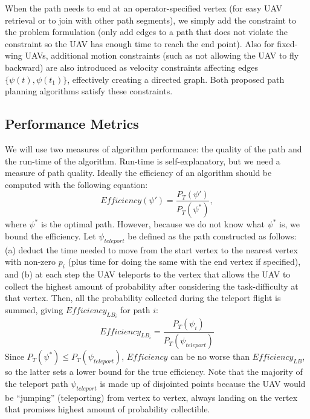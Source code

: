 When the path needs to end at an operator-specified vertex (for easy UAV retrieval or to join with other path segments), we simply add the constraint to the problem formulation (only add edges to a path that does not violate the constraint so the UAV has enough time to reach the end point). Also for fixed-wing UAVs, additional motion constraints (such as not allowing the UAV to fly backward) are also introduced as velocity constraints affecting edges $\{\psi(t), \psi(t_1)\}$, effectively creating a directed graph. Both proposed path planning algorithms satisfy these constraints.

\subsection{Performance Metrics}

We will use two measures of algorithm performance: the quality of the path and the run-time of the algorithm. Run-time is self-explanatory, but we need a measure of path quality. Ideally the efficiency of an algorithm should be computed with the following equation:
\begin{equation}
\mathit{Efficiency}(\psi') = \frac{P_T(\psi')}{P_T(\psi^*)},
\label{Efficiency}
\end{equation}
where $\psi^*$ is the optimal path. However, because we do not know what $\psi^*$ is, we bound the efficiency. Let $\psi_{teleport}$ be defined as the path constructed as follows: (a) deduct the time needed to move from the start vertex to the nearest vertex with non-zero $p_i$ (plus time for doing the same with the end vertex if specified), and (b) at each step the UAV teleports to the vertex that allows the UAV to collect the highest amount of probability after considering the task-difficulty at that vertex. Then, all the probability collected during the teleport flight is summed, giving $\mathit{Efficiency_{LB_i}}$ for path $i$:
\begin{equation}
\mathit{Efficiency_{LB_i}} = \frac{P_T(\psi_i)}{P_T(\psi_{teleport})}
\label{EfficiencyLB}
\end{equation}
Since $P_T(\psi^*) \leq P_T(\psi_{teleport})$, $\mathit{Efficiency}$ can be no worse than $\mathit{Efficiency_{LB}}$, so the latter sets a lower bound for the true efficiency. Note that the majority of the teleport path $\psi_{teleport}$ is made up of disjointed points because the UAV would be ``jumping'' (teleporting) from vertex to vertex, always landing on the vertex that promises highest amount of probability collectible.

